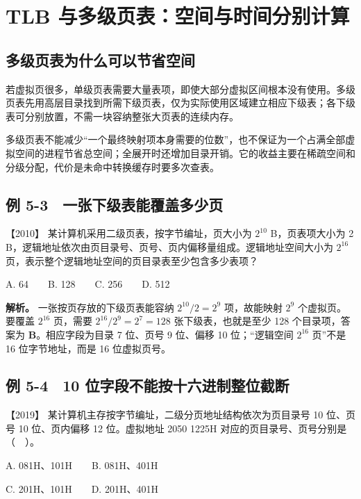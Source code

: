 \section{TLB 与多级页表：空间与时间分别计算}\label{os-5-5}

\subsection{多级页表为什么可以节省空间}\label{os-c05-h79}

若虚拟页很多，单级页表需要大量表项，即使大部分虚拟区间根本没有使用。多级页表先用高层目录找到所需下级页表，仅为实际使用区域建立相应下级表；各下级表可分别放置，不需一块容纳整张大页表的连续内存。

多级页表不能减少``一个最终映射项本身需要的位数''，也不保证为一个占满全部虚拟空间的进程节省总空间；全展开时还增加目录开销。它的收益主要在稀疏空间和分级分配，代价是未命中转换缓存时要多次查表。

\subsection{例 5-3　一张下级表能覆盖多少页}\label{os-ex5-3}

\noindent{}【2010】 某计算机采用二级页表，按字节编址，页大小为 \(2^{10}\) B，页表项大小为 2 B，逻辑地址依次由页目录号、页号、页内偏移量组成。逻辑地址空间大小为 \(2^{16}\) 页，表示整个逻辑地址空间的页目录表至少包含多少表项？

A. 64　　B. 128　　C. 256　　D. 512


\textbf{解析。} 一张按页存放的下级页表能容纳 \(2^{10}/2=2^9\) 项，故能映射 \(2^9\) 个虚拟页。要覆盖 \(2^{16}\) 页，需要 \(2^{16}/2^9=2^7=128\) 张下级表，也就是至少 128 个目录项，答案为 \textbf{B}。相应字段为目录 7 位、页号 9 位、偏移 10 位；``逻辑空间 \(2^{16}\) 页''不是 16 位字节地址，而是 16 位虚拟页号。

\subsection{例 5-4　10 位字段不能按十六进制整位截断}\label{os-ex5-4}

\noindent{}【2019】 某计算机主存按字节编址，二级分页地址结构依次为页目录号 10 位、页号 10 位、页内偏移 12 位。虚拟地址 2050 1225H 对应的页目录号、页号分别是（　）。

A. 081H、101H　　B. 081H、401H

C. 201H、101H　　D. 201H、401H

